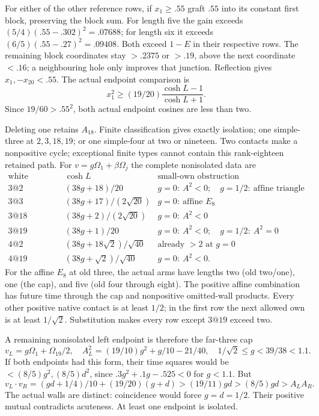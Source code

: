 \documentclass[11pt]{article}
\theoremstyle{definition}
\theoremstyle{remark}
\begin{document}
For either of the other reference
rows, if \(x_1\ge.55\) graft \(.55\)
into its constant first block,
preserving the block sum.
For length five the gain exceeds
\((5/4)(.55-.302)^2=.07688\);
for length six it exceeds
\((6/5)(.55-.27)^2=.09408\).
Both exceed \(1-E\) in their
respective rows.
The remaining block coordinates
stay \(>.2375\) or \(>.19\),
above the next coordinate \(<.16\);
a neighbouring hole only improves
that junction.
Reflection gives
\(x_1,-x_{20}<.55\).
The actual endpoint comparison is
\[
               x_1^2\ge(19/20)
                       \frac{\cosh L-1}{\cosh L+1}.
\]
Since \(19/60>.55^2\), both actual
endpoint cosines are less than two.

Deleting one retains \(A_{18}\).
Finite classification gives exactly
isolation; one simple-three at
\(2,3,18,19\); or one simple-four
at two or nineteen.
Two contacts make a nonpositive
cycle; exceptional finite types
cannot contain this rank-eighteen
retained path.
For \(v=g\Omega_1+\beta\Omega_j\)
the complete nonisolated data are
\[
\begin{array}{c|c|l}
 \text{white contact}&\cosh L&\text{small-own obstruction}\\ \hline
 3@2&(38g+18)/20&g=0:\ A^2<0;\quad g=1/2:\ \text{affine triangle}\\
 3@3&(38g+17)/(2\sqrt{20})&g=0:\ \text{affine }E_8\\
 3@18&(38g+2)/(2\sqrt{20})&g=0:\ A^2<0\\
 3@19&(38g+1)/20&g=0:\ A^2<0;\quad g=1/2:\ A^2=0\\
 4@2&(38g+18\sqrt2)/\sqrt{40}&\text{already }>2\text{ at }g=0\\
 4@19&(38g+\sqrt2)/\sqrt{40}&g=0:\ A^2<0 .
\end{array}
\]
For the affine \(E_8\) at old three,
the actual arms have lengths
two (old two/one), one (the cap),
and five (old four through eight).
The positive affine combination has
future time through the cap and
nonpositive omitted-wall products.
Every other positive native contact
is at least \(1/2\); in the first
row the next allowed own is at
least \(1/\sqrt2\).
Substitution makes every row
except \(3@19\) exceed two.

A remaining nonisolated left endpoint
is therefore the far-three cap
\[
 v_L=g\Omega_1+\Omega_{19}/2,\quad
 A_L^2=(19/10)g^2+g/10-21/40,\quad
                    1/\sqrt2\le g<39/38<1.1 .
\]
If both endpoints had this form,
their time squares would be
\(<(8/5)g^2,(8/5)d^2\), since
\(.3g^2+.1g-.525<0\) for \(g<1.1\).
But
\[
 v_L\cdot v_R=(gd+1/4)/10+(19/20)(g+d)
                        >(19/11)gd>(8/5)gd>A_LA_R .
\]
The actual walls are distinct:
coincidence would force \(g=d=1/2\).
Their positive mutual contradicts
acuteness.
At least one endpoint is isolated.
\end{document}
